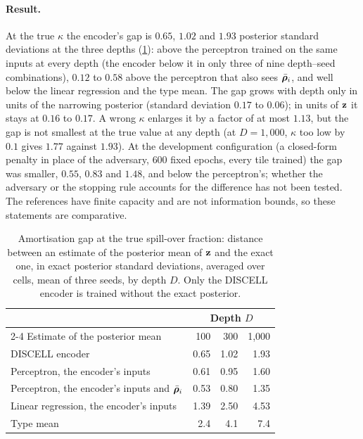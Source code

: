 \paragraph{Result.} At the true $\kappa$ the encoder's gap is $0.65$, $1.02$ and $1.93$ posterior standard deviations at the three depths (\cref{tab:planted-gap}): above the perceptron trained on the same inputs at every depth (the encoder below it in only three of nine depth--seed combinations), $0.12$ to $0.58$ above the perceptron that also sees $\bar{\boldsymbol{\rho}}_i$, and well below the linear regression and the type mean. The gap grows with depth only in units of the narrowing posterior (standard deviation $0.17$ to $0.06$); in units of $\mathbf{z}$ it stays at $0.16$ to $0.17$. A wrong $\kappa$ enlarges it by a factor of at most $1.13$, but the gap is not smallest at the true value at any depth (at $D = 1{,}000$, $\kappa$ too low by $0.1$ gives $1.77$ against $1.93$). At the development configuration (a closed-form penalty in place of the adversary, $600$ fixed epochs, every tile trained) the gap was smaller, $0.55$, $0.83$ and $1.48$, and below the perceptron's; whether the adversary or the stopping rule accounts for the difference has not been tested. The references have finite capacity and are not information bounds, so these statements are comparative.

\begin{table}[t]
\centering
\caption{Amortisation gap at the true spill-over fraction: distance between an estimate of the posterior mean of $\mathbf{z}$ and the exact one, in exact posterior standard deviations, averaged over cells, mean of three seeds, by depth $D$. Only the DISCELL encoder is trained without the exact posterior.}
\label{tab:planted-gap}
\small
\begin{tabular}{@{}lrrr@{}}
\toprule
& \multicolumn{3}{c}{Depth $D$} \\
\cmidrule(l){2-4}
Estimate of the posterior mean & 100 & 300 & 1{,}000 \\
\midrule
DISCELL encoder & 0.65 & 1.02 & 1.93 \\
Perceptron, the encoder's inputs & 0.61 & 0.95 & 1.60 \\
Perceptron, the encoder's inputs and $\bar{\boldsymbol{\rho}}_i$ & 0.53 & 0.80 & 1.35 \\
Linear regression, the encoder's inputs & 1.39 & 2.50 & 4.53 \\
Type mean & 2.4 & 4.1 & 7.4 \\
\bottomrule
\end{tabular}
\end{table}
